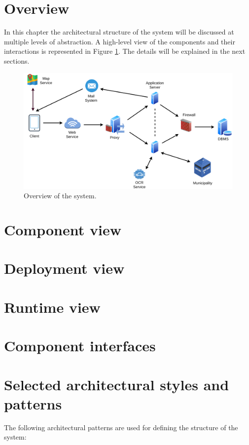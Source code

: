 \documentclass{report}
\begin{document}
\section{Overview}
In this chapter the architectural structure of the system will be discussed at multiple levels of abstraction. A high-level view of the components and their interactions is represented in Figure \ref{fig:overview}. The details will be explained in the next sections.
\begin{figure}[!ht]
	\begin{center}
	\includegraphics[width=\textwidth]{img/HighLevelOverview.png}
    \end{center}
    \label{fig:overview}
	\caption{Overview of the system.}
\end{figure}

\section{Component view}

\section{Deployment view}

\section{Runtime view}

\section{Component interfaces}

\section{Selected architectural	styles and patterns}
The following architectural patterns are used for defining the structure of the system:
\end{document}
